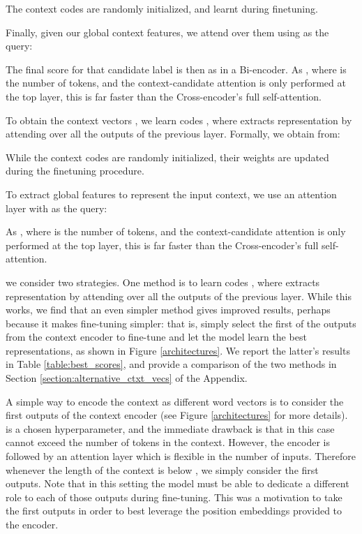 \documentclass{article} \usepackage{iclr2020_conference,times}
\begin{document}
The  context codes are randomly initialized, and learnt during finetuning. 

Finally, given our   global context features, we attend over them using  as the query:

The final score for that candidate label is then  as in a Bi-encoder.
As , where  is the number of tokens, and the context-candidate attention is only performed at the top layer, this is far faster than the Cross-encoder's full self-attention.




To obtain the  context vectors , we learn  codes , where  extracts representation  by attending over all the outputs of the previous layer. Formally, we obtain  from: 

While the  context codes are randomly initialized, their weights are updated during the finetuning procedure. 



To extract  global features to represent
 the input context, we use an attention layer with  as the query:

As , where  is the number of tokens, and the context-candidate attention is only performed at the top layer, this is far faster than the Cross-encoder's full self-attention.
\fi

we consider two strategies. One method is to learn  codes , where  extracts representation  by attending over all the outputs of the previous layer. While this works, we find that an even simpler method gives improved results, perhaps because it makes fine-tuning simpler: that is, simply select the first  of the outputs from the context encoder to fine-tune and let the model learn the best representations, as shown in Figure  \ref{architectures}. We report the latter's results in Table \ref{table:best_scores}, and provide a comparison of the two methods in Section \ref{section:alternative_ctxt_vecs} of the Appendix.
\fi








A simple way to encode the context as  different word vectors is to consider the first  outputs of the context encoder (see Figure \ref{architectures} for more details).  is a chosen hyperparameter, and the immediate drawback is that  in this case cannot exceed the number of tokens in the context. However, the encoder is followed by an attention layer which is flexible in the number of inputs. Therefore whenever the length of the context  is below , we simply consider the first  outputs. Note that in this setting the model must be able to dedicate a different role to each of those outputs during fine-tuning. This was a motivation to take the first  outputs in order to best leverage the position embeddings provided to the encoder.
\fi
\end{document}
